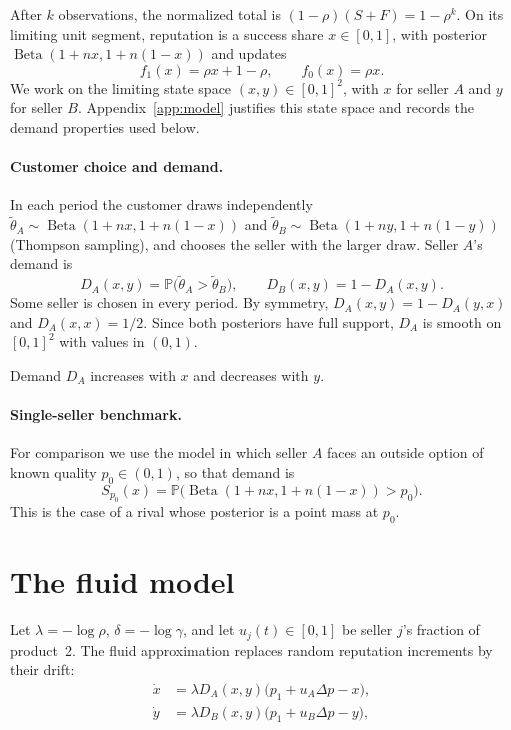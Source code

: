 \documentclass[11pt]{article}
\newcommand{\Pb}{\mathbb P}
\DeclareMathOperator{\Beta}{Beta}
\theoremstyle{definition}
\begin{document}
After $k$ observations, the normalized total is
$(1-\rho)(S+F)=1-\rho^k$. On its limiting unit segment, reputation is a
success share $x\in[0,1]$, with posterior $\Beta(1+nx,1+n(1-x))$ and updates
\begin{equation}\label{eq:share-maps}
f_1(x)=\rho x+1-\rho,\qquad f_0(x)=\rho x.
\end{equation}
We work on the limiting state space $(x,y)\in[0,1]^2$, with $x$ for seller
$A$ and $y$ for seller $B$. Appendix~\ref{app:model} justifies this state
space and records the demand properties used below.

\paragraph{Customer choice and demand.}
In each period the customer draws independently
$\widetilde\theta_A\sim\Beta(1+nx,1+n(1-x))$ and
$\widetilde\theta_B\sim\Beta(1+ny,1+n(1-y))$ (Thompson sampling), and
chooses the seller with the larger draw. Seller $A$'s demand is
\begin{equation}\label{eq:boundary-demand}
D_A(x,y)=\Pb\bigl(\widetilde\theta_A>\widetilde\theta_B\bigr),
\qquad D_B(x,y)=1-D_A(x,y).
\end{equation}
Some seller is chosen in every period. By symmetry,
$D_A(x,y)=1-D_A(y,x)$ and $D_A(x,x)=1/2$. Since both posteriors have full
support, $D_A$ is smooth on $[0,1]^2$ with values in $(0,1)$.

Demand $D_A$ increases with $x$ and decreases with $y$.

\paragraph{Single-seller benchmark.}
For comparison we use the model in which seller $A$ faces an outside option
of known quality $p_0\in(0,1)$, so that demand is
\begin{equation*}
S_{p_0}(x)=\Pb\bigl(\Beta(1+nx,1+n(1-x))>p_0\bigr).
\end{equation*}
This is the case of a rival whose posterior is a point mass at $p_0$.

\section{The fluid model}\label{sec:fluid-derivation}

Let $\lambda=-\log\rho$, $\delta=-\log\gamma$, and let
$u_j(t)\in[0,1]$ be seller $j$'s fraction of product~2. The fluid
approximation replaces random reputation increments by their drift:
\begin{equation}\label{eq:duopoly-fluid}
\begin{aligned}
\dot x&=\lambda D_A(x,y)\bigl(p_1+u_A\Delta p-x\bigr),\\
\dot y&=\lambda D_B(x,y)\bigl(p_1+u_B\Delta p-y\bigr),
\end{aligned}
\end{equation}
\end{document}
